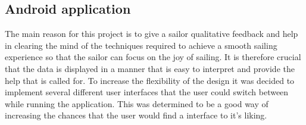 \subsection{Android application}
The main reason for this project is to give a sailor qualitative feedback and help in clearing the mind of the techniques required to achieve a smooth sailing experience so that the sailor can focus on the joy of sailing. It is therefore crucial that the data is displayed in a manner that is easy to interpret and provide the help that is called for. To increase the flexibility of the design it was decided to implement several different user interfaces that the user could switch between while running the application. This was determined to be a good way of increasing the chances that the user would find a interface to it's liking. 